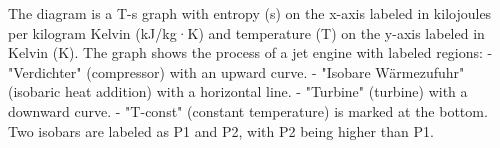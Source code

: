 The diagram is a T-s graph with entropy (s) on the x-axis labeled in kilojoules per kilogram Kelvin (kJ/kg·K) and temperature (T) on the y-axis labeled in Kelvin (K). The graph shows the process of a jet engine with labeled regions:  
- "Verdichter" (compressor) with an upward curve.  
- "Isobare Wärmezufuhr" (isobaric heat addition) with a horizontal line.  
- "Turbine" (turbine) with a downward curve.  
- "T-const" (constant temperature) is marked at the bottom.  
Two isobars are labeled as P1 and P2, with P2 being higher than P1.